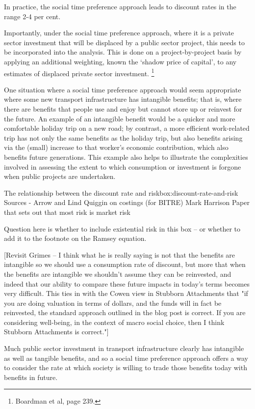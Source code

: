 In practice, the social time preference approach leads to discount rates in the range 2-4 per cent.  

Importantly, under the social time preference approach, where it is a private sector investment that will be displaced by a public sector project, this needs to be incorporated into the analysis. This is done on a project-by-project basis by applying an additional weighting, known the ‘shadow price of capital’, to any estimates of displaced private sector investment.%
    \footnote{Boardman et al,  page 239.}

One situation where a social time preference approach would seem appropriate where some new transport infrastructure has intangible benefits; that is, where there are benefits that people use and enjoy but cannot store up or reinvest for the future.  An example of an intangible benefit would be a quicker and more comfortable holiday trip on a new road; by contrast, a more efficient work-related trip has not only the same benefits as the holiday trip, but also benefits arising via the (small) increase to that worker’s economic contribution, which also benefits future generations. This example also helps to illustrate the complexities involved in assessing the extent to which consumption or investment is forgone when public projects are undertaken. 

\begin{smallbox}{The relationship between the discount rate and risk}{box:discount-rate-and-risk}
Sources - 
Arrow and Lind
Quiggin on costings (for BITRE)
Mark Harrison
Paper that sets out that most risk is market risk

Question here is whether to include existential risk in this box -- or whether to add it to the footnote on the Ramsey equation.  

\end{smallbox}

[Revisit Grimes -- I think what he is really saying is not that the benefits are intangible so we should use a consumption rate of discount, but more that when the benefits are intangible we shouldn't assume they can be reinvested, and indeed that our ability to compare these future impacts in today's terms becomes very difficult. This ties in with the Cowen view in Stubborn Attachments that "if you are doing valuation in terms of dollars, and the funds will in fact be reinvested, the standard approach outlined in the blog post is correct. If you are considering well-being, in the context of macro social choice, then I think Stubborn Attachments is correct."]

Much public sector investment in transport infrastructure clearly has intangible as well as tangible benefits, and so a social time preference approach offers a way to consider the rate at which society is willing to trade those benefits today with benefits in future.
